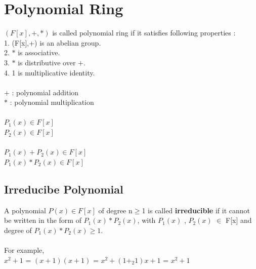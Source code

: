 \documentclass[11pt]{article}
\begin{document}
\section*{Polynomial Ring}
$(F[x],+,*)$ is called polynomial ring if it satisfies following properties : \\
1. (F[x],+) is an abelian group. \\
2. $*$ is associative. \\
3. $*$ is distributive over $+$. \\
4. 1 is multiplicative identity. \\ \\
$+$ : polynomial addition \\
$*$ : polynomial multiplication \\ \\
$P_{1}(x) \in F[x] $ \\
$P_{2}(x) \in F[x] $ \\ \\
$P_{1}(x) + P_{2}(x) \in F[x] $ \\
$P_{1}(x) * P_{2}(x) \in F[x] $ 

\subsection*{Irreducibe Polynomial}
A polynomial $P(x) \in F[x]$ of degree n$\geq$1 is called \textbf{irreducible} if it cannot be written in the form of $P_{1}(x) * P_{2}(x)$, with $P_{1}(x)$ , $P_{2}(x)$ $\in$ F[x] and degree of $P_{1}(x) * P_{2}(x) \geq 1$. \\
\\
For example, \\
$x^{2}+1$ = $(x+1)(x+1)$ = $x^{2} + (1+_{2}1)x + 1$ = $x^{2}+1$ 
\end{document}
